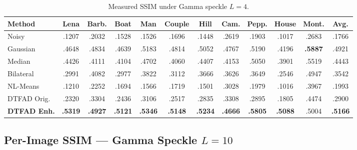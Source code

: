\documentclass[12pt,a4paper]{article}
\newcommand{\best}[1]{\textcolor{bestgreen}{\textbf{#1}}}
\begin{document}
\begin{table}[H]
\centering
\caption{Measured SSIM under Gamma speckle $L=4$.}
\label{tab:ssim_L4_measured}
\small
\setlength{\tabcolsep}{3pt}
\begin{tabular}{l*{10}{c}|c}
\toprule
\textbf{Method} & \textbf{Lena} & \textbf{Barb.} & \textbf{Boat} & \textbf{Man} & \textbf{Couple} & \textbf{Hill} & \textbf{Cam.} & \textbf{Pepp.} & \textbf{House} & \textbf{Mont.} & \textbf{Avg.} \\
\midrule
\rowcolor{lightblue!30}
Noisy & .1207 & .2032 & .1528 & .1526 & .1696 & .1448 & .2619 & .1903 & .1017 & .2683 & .1766 \\
\midrule
Gaussian & .4648 & .4834 & .4639 & .5183 & .4814 & .5052 & .4767 & .5190 & .4196 & \best{.5887} & .4921 \\
Median & .4426 & .4111 & .4104 & .4702 & .4060 & .4407 & .4153 & .5050 & .3901 & .5519 & .4443 \\
Bilateral & .2991 & .4082 & .2977 & .3822 & .3112 & .3666 & .3626 & .3649 & .2546 & .4947 & .3542 \\
NL-Means & .1210 & .2252 & .1694 & .1566 & .1719 & .1501 & .3028 & .1979 & .1016 & .3967 & .1993 \\
DTFAD Orig. & .2320 & .3304 & .2436 & .3106 & .2517 & .2835 & .3308 & .2895 & .1805 & .4474 & .2900 \\
\textbf{DTFAD Enh.} & \best{.5319} & \best{.4927} & \best{.5121} & \best{.5346} & \best{.5148} & \best{.5234} & \best{.4666} & \best{.5805} & \best{.5088} & .5004 & \best{.5166} \\
\bottomrule
\end{tabular}
\end{table}

\subsection{Per-Image SSIM — Gamma Speckle $L=10$}
\end{document}
